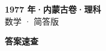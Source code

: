 \documentclass[zihao=-4, a4paper]{ctexart}
\begin{document}
\begin{center}
  {\Large\bfseries 1977 年·内蒙古卷·理科}\\[4pt]
  {\large 数学 · 简答版}
\end{center}
\medskip
{}

\clearpage
{}
\begin{center}{\Large\bfseries 答案速查}\end{center}
\medskip

\end{document}
